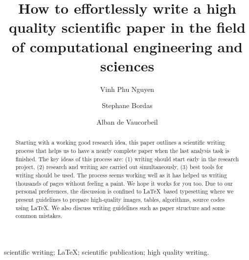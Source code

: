 \documentclass[authoryear,3p,times,preprint,review,fleqn]{elsarticle}
\numberwithin{equation}{section}
\theoremstyle{remark}
\begin{document}

\begin{frontmatter}



\title{\textbf{How to effortlessly write a high quality scientific paper in the field of computational engineering and sciences }}



\author[1]{Vinh Phu Nguyen}
\author[2]{Stephane Bordas}
\author[3]{Alban de Vaucorbeil}


\address[1]{Department of Civil Engineering, Monash University, Clayton 3800, VIC, Australia}
\address[2]{Institute of Computational Engineering, University of Luxembourg, Faculty of Sciences Communication and Technology, Luxembourg}
\address[3]{Institute for Frontier Materials, Deakin University, Geelong, VIC, 3216, Australia}



\begin{abstract}
Starting with a working good research idea, this paper outlines a scientific writing process that helps us to have a nearly complete paper when the last analysis task is finished.  The key ideas of this process are: (1) writing should start early in the research project, (2) research and writing are carried out simultaneously, (3) best tools for writing should be used.  The process seems working well as it has helped us writing thousands of pages without feeling a paint. We hope it works for you too.  Due to our personal preferences, the discussion is confined to \LaTeX\ based typesetting where we present guidelines to prepare high-quality images, tables, algorithms, source codes using \LaTeX. We also discuss writing guidelines such as paper structure and some common mistakes.
\end{abstract}


\begin{keyword}
 scientific writing; \LaTeX; scientific publication; high quality writing.
\end{keyword}


\end{frontmatter}
\end{document}
